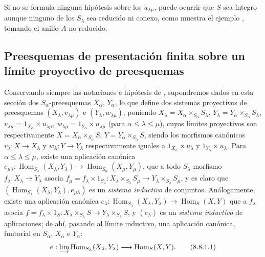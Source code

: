 \begin{remark}[8.7.4]
\label{IV.8.7.4-fr}
Si no se formula ninguna hipótesis sobre los $u_{\lambda\mu}$, puede ocurrir que $S$ sea íntegro aunque ninguno de los $S_\lambda$ sea reducido ni conexo, como muestra el ejemplo , tomando el anillo $A$ no reducido.
\end{remark}

\subsection{Preesquemas de presentación finita sobre un límite proyectivo de preesquemas}
\label{subsection:IV.8.8-fr}

\begin{env}[8.8.1]
\label{IV.8.8.1-fr}
Conservando siempre las notaciones e hipótesis de , supondremos dados en esta sección dos $S_\alpha$-preesquemas $X_\alpha$, $Y_\alpha$, lo que define  dos sistemas proyectivos de preesquemas $(X_\lambda,v_{\lambda\mu})$ e $(Y_\lambda,w_{\lambda\mu})$, poniendo $X_\lambda=X_\alpha\times_{S_\alpha}S_\lambda$, $Y_\lambda=Y_\alpha\times_{S_\alpha}S_\lambda$, $v_{\lambda\mu}=1_{X_\alpha}\times u_{\lambda\mu}$, $w_{\lambda\mu}=1_{Y_\alpha}\times u_{\lambda\mu}$ (para $\alpha\leq\lambda\leq\mu$), cuyos límites proyectivos son respectivamente $X=X_\alpha\times_{S_\alpha}S$, $Y=Y_\alpha\times_{S_\alpha}S$, siendo los morfismos canónicos $v_\lambda:X\to X_\lambda$ y $w_\lambda:Y\to Y_\lambda$ respectivamente iguales a $1_{X_\alpha}\times u_\lambda$ y $1_{Y_\alpha}\times u_\lambda$.
Para $\alpha\leq\lambda\leq\mu$, existe una aplicación canónica $e_{\mu\lambda}:\operatorname{Hom}_{S_\lambda}(X_\lambda,Y_\lambda)\to
\operatorname{Hom}_{S_\mu}(X_\mu,Y_\mu)$, que a todo $S_\lambda$-morfismo $f_\lambda:X_\lambda\to Y_\lambda$ asocia $f_\mu=f_\lambda\times1_{S_\mu}:X_\lambda\times_{S_\lambda}S_\mu\to
Y_\lambda\times_{S_\lambda}S_\mu$, y es claro que $(\operatorname{Hom}_{S_\lambda}(X_\lambda,Y_\lambda),e_{\mu\lambda})$ es un \emph{sistema inductivo} de conjuntos.
Análogamente, existe una aplicación canónica $e_\lambda:\operatorname{Hom}_{S_\lambda}(X_\lambda,Y_\lambda)\to
\operatorname{Hom}_S(X,Y)$ que a $f_\lambda$ asocia $f=f_\lambda\times1_S:X_\lambda\times_{S_\lambda}S\to
Y_\lambda\times_{S_\lambda}S$, y $(e_\lambda)$ es un \emph{sistema inductivo} de aplicaciones; de ahí, pasando al límite inductivo, una aplicación canónica, funtorial en $S_\alpha$, $X_\alpha$ e $Y_\alpha$:
\begin{equation}
e:\varinjlim\operatorname{Hom}_{S_\lambda}(X_\lambda,Y_\lambda)
\longrightarrow\operatorname{Hom}_S(X,Y).
\tag{8.8.1.1}\label{IV.8.8.1.1-fr}
\end{equation}
\end{env}

